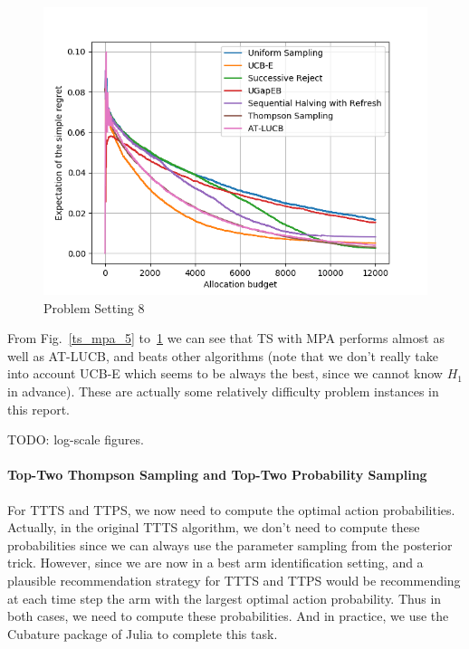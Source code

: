 \documentclass[runningheads,a4paper]{llncs}
\begin{document}
\begin{figure}[ht]
    	\centering\includegraphics[width=\textwidth]{../results/ts_mpa/setting8.png}
    	\caption{Problem Setting 8}
	\label{ts_mpa_8}
\end{figure}

From Fig.~\ref{ts_mpa_5} to~\ref{ts_mpa_8} we can see that TS with MPA performs almost as well as AT-LUCB, and beats other algorithms (note that we don't really take into account UCB-E which seems to be always the best, since we cannot know $H_1$ in advance). These are actually some relatively difficulty problem instances in this report.

TODO: log-scale figures.

\paragraph{\bfseries{Top-Two Thompson Sampling and Top-Two Probability Sampling}}
For TTTS and TTPS, we now need to compute the optimal action probabilities. Actually, in the original TTTS algorithm, we don't need to compute these probabilities since we can always use the parameter sampling from the posterior trick. However, since we are now in a best arm identification setting, and a plausible recommendation strategy for TTTS and TTPS would be recommending at each time step the arm with the largest optimal action probability. Thus in both cases, we need to compute these probabilities. And in practice, we use the Cubature package of Julia to complete this task.
\end{document}
